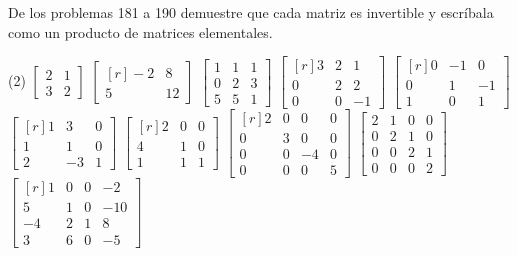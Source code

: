 De los problemas 181 a 190 demuestre que cada matriz es invertible y escríbala como un producto de matrices elementales.
\begin{tasks}[
    start=181,
    style=enumerate,
    label-offset = 4mm,
    ](2)
    \task $\begin{bmatrix*}2 & 1 \\ 3 & 2\end{bmatrix*}$
    \task $\begin{bmatrix*}[r]-2 & 8 \\ 5 & 12\end{bmatrix*}$
    \task $\begin{bmatrix*}1 & 1 & 1 \\ 0 & 2 & 3 \\ 5 & 5 & 1\end{bmatrix*}$
    \task $\begin{bmatrix*}[r]3 & 2 & 1 \\ 0 & 2 & 2 \\ 0 & 0 & -1\end{bmatrix*}$
    \task $\begin{bmatrix*}[r]0 & -1 & 0 \\ 0 & 1 & -1 \\ 1 & 0 & 1\end{bmatrix*}$
    \task $\begin{bmatrix*}[r]1 & 3 & 0 \\ 1 & 1 & 0 \\ 2 & -3 & 1\end{bmatrix*}$
    \task $\begin{bmatrix*}[r]2 & 0 & 0 \\ 4 & 1 & 0 \\ 1 & 1 & 1\end{bmatrix*}$
    \task $\begin{bmatrix*}[r]2 & 0 & 0 & 0 \\ 0 & 3 & 0 & 0 \\ 0 & 0 & -4 & 0 \\ 0 & 0 & 0 & 5\end{bmatrix*}$
    \task $\begin{bmatrix*}2 & 1 & 0 & 0 \\ 0 & 2 & 1 & 0 \\ 0 & 0 & 2 & 1 \\ 0 & 0 & 0 & 2\end{bmatrix*}$
    \task $\begin{bmatrix*}[r]1 & 0 & 0 & -2 \\ 5 & 1 & 0 & -10 \\ -4 & 2 & 1 & 8 \\ 3 & 6 & 0 & -5\end{bmatrix*}$
\end{tasks}